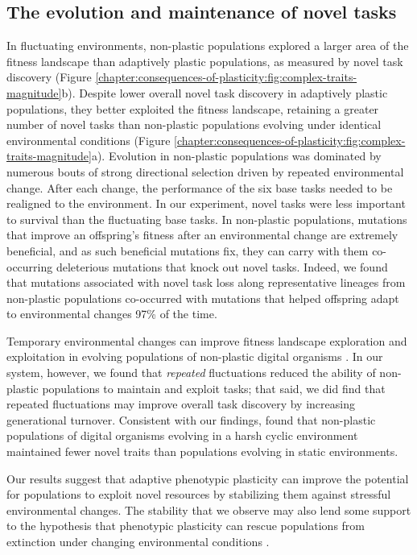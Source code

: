 \subsection{The evolution and maintenance of novel tasks}

In fluctuating environments, non-plastic populations explored a larger area of the fitness landscape than adaptively plastic populations, as measured by novel task discovery (Figure \ref{chapter:consequences-of-plasticity:fig:complex-traits-magnitude}b).
Despite lower overall novel task discovery in adaptively plastic populations, they better exploited the fitness landscape, retaining a greater number of novel tasks than non-plastic populations evolving under identical environmental conditions (Figure \ref{chapter:consequences-of-plasticity:fig:complex-traits-magnitude}a).
Evolution in non-plastic populations was dominated by numerous bouts of strong directional selection driven by repeated environmental change.
After each change, the performance of the six base tasks needed to be realigned to the environment. 
In our experiment, novel tasks were less important to survival than the fluctuating base tasks.
In non-plastic populations, mutations that improve an offspring's fitness after an environmental change are extremely beneficial, and as such beneficial mutations fix, they can carry with them co-occurring deleterious mutations that knock out novel tasks. 
Indeed, we found that mutations associated with novel task loss along representative lineages from non-plastic populations co-occurred with mutations that helped offspring adapt to environmental changes 97\% of the time.

Temporary environmental changes can improve fitness landscape exploration and exploitation in evolving populations of non-plastic digital organisms \citep{nahum_improved_2017}.
In our system, however, we found that \textit{repeated} fluctuations reduced the ability of non-plastic populations to maintain and exploit tasks; that said, we did find that repeated fluctuations may improve overall task discovery by increasing generational turnover. 
Consistent with our findings, \cite{canino-koning_fluctuating_2019} found that non-plastic populations of digital organisms evolving in a harsh cyclic environment maintained fewer novel traits than populations evolving in static environments.

Our results suggest that adaptive phenotypic plasticity can improve the potential for populations to exploit novel resources by stabilizing them against stressful environmental changes.
The stability that we observe may also lend some support to the hypothesis that phenotypic plasticity can rescue populations from extinction under changing environmental conditions \citep{chevin_adaptation_2010}.

